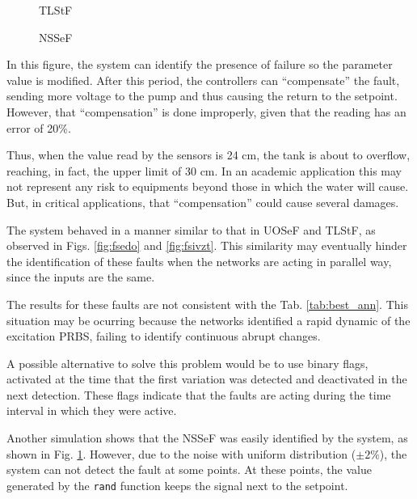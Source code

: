 \documentclass[10pt,fleqn,a4paper]{article}
\begin{document}
\begin{figure}[htb]
    \begin{minipage}[b]{0.48\linewidth}
        \scalebox{0.65}{}
        \vspace{0.5cm}
        \caption{TLStF}
        \label{fig:fsivzt}
    \end{minipage}
    \hfill
    \begin{minipage}[b]{0.48\linewidth}
        \scalebox{0.65}{}
        \vspace{0.5cm}
        \caption{NSSeF}
        \label{fig:fsesr}
    \end{minipage}
\end{figure}

In this figure, the system can identify the presence of failure so the parameter
value is modified. After this period, the controllers can ``compensate'' the
fault, sending more voltage to the pump and thus causing the return to the
setpoint. However, that ``compensation'' is done improperly, given that the
reading has an error of 20\%.

Thus, when the value read by the sensors is 24 cm, the tank is about to
overflow, reaching, in fact, the upper limit of 30 cm. In an academic
application this may not represent any risk to equipments beyond those in which
the water will cause. But, in critical applications, that ``compensation'' could
cause several damages.

The system behaved in a manner similar to that in UOSeF and TLStF, as observed
in Figs. \ref{fig:fsedo} and \ref{fig:fsivzt}. This similarity may eventually
hinder the identification of these faults when the networks are acting in
parallel way, since the inputs are the same.

The results for these faults are not consistent with the Tab.
\ref{tab:best_ann}. This situation may be ocurring because the networks
identified a rapid dynamic of the excitation PRBS, failing to identify
continuous abrupt changes.

A possible alternative to solve this problem would be to use binary flags,
activated at the time that the first variation was detected and deactivated in
the next detection. These flags indicate that the faults are acting during the
time interval in which they were active.

Another simulation shows that the NSSeF was easily identified by the system, as
shown in Fig. \ref{fig:fsesr}. However, due to the noise with uniform
distribution ($\pm 2\%$), the system can not detect the fault at some points. At
these points, the value generated by the {\tt rand} function keeps the signal
next to the setpoint.
\end{document}
